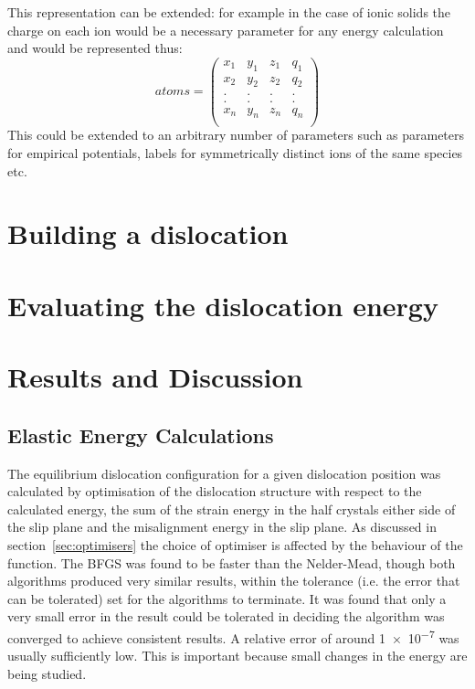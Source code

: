 This representation can be extended: for example in the case of ionic solids the charge on each ion would be a necessary parameter for any energy calculation and would be represented thus:
$$
atoms = \begin{pmatrix}
x_1 & y_1 & z_1 & q_1 \\
x_2 & y_2 & z_2 & q_2 \\
.   &.    &.    &.    \\
.   &.    &.    &.    \\
x_n & y_n & z_n & q_n \\
\end{pmatrix}
$$
This could be extended to an arbitrary number of parameters such as parameters for empirical potentials, labels for symmetrically distinct ions of the same species etc.





\section{Building a dislocation}
\FloatBarrier
\label{sec:build}










\section{Evaluating the dislocation energy}
\label{sec:dislocation_energy}






\section{Results and Discussion}

\subsection{Elastic Energy Calculations}
\label{sec:elastic_results}

The equilibrium dislocation configuration for a given dislocation position was calculated by optimisation of the dislocation structure with respect to the calculated energy, the sum of the strain energy in the half crystals either side of the slip plane and the misalignment energy in the slip plane. As discussed in section~\ref{sec:optimisers} the choice of optimiser is affected by the behaviour of the function. The BFGS was found to be faster than the Nelder-Mead, though both algorithms produced very similar results, within the tolerance (i.e. the error that can be tolerated) set for the algorithms to terminate. It was found that only a very small error in the result could be tolerated in deciding the algorithm was converged to achieve consistent results. A relative error of around \num{1e-7} was usually sufficiently low. This is important because small changes in the energy are being studied. 

